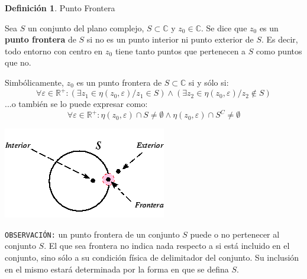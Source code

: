 \documentclass[12pt]{article}
\theoremstyle{definition}
\newtheorem{definition}{Definici\'on}[section]
\begin{document}
\colorbox{yellow!40!white!80}{\parbox{\linewidth}{
\theoremstyle{definition}
\begin{definition} Punto Frontera

Sea $S$ un conjunto del plano complejo, $S \subset \mathbb{C}$ y $z_0 \in \mathbb{C}$. Se dice que $z_0$ es un \textbf{punto frontera} de $S$ si no es un punto interior ni punto exterior de $S$. Es decir, todo entorno con centro en $z_0$ tiene tanto puntos que pertenecen a $S$ como puntos que no.

Simb\'olicamente, $z_0$ es un punto frontera de $S \subset \mathbb{C}$ si y s\'olo si:
$$\forall \varepsilon \in \mathbb{R}^+ : \left( \exists z_1 \in \eta(z_0, \varepsilon) / z_1 \in S \right) \land \left( \exists z_2 \in \eta(z_0, \varepsilon) / z_2 \notin S \right)$$
...o tambi\'en se lo puede expresar como:
$$ \forall \varepsilon \in \mathbb{R}^+ : \eta(z_0, \varepsilon) \cap S \neq \emptyset \land  \eta(z_0, \varepsilon) \cap S^C \neq \emptyset $$
\end{definition}}}
\linebreak

\begin{center}
	\includegraphics[scale=1]{pfrontera.png}
\end{center}


\texttt{OBSERVACI\'ON:} un punto frontera de un conjunto $S$ puede o no pertenecer al conjunto $S$. El que sea frontera no indica nada respecto a si est\'a incluido en el conjunto, sino s\'olo a su condici\'on f\'isica de delimitador del conjunto. Su inclusi\'on en el mismo estar\'a determinada por la forma en que se defina $S$.
\end{document}
